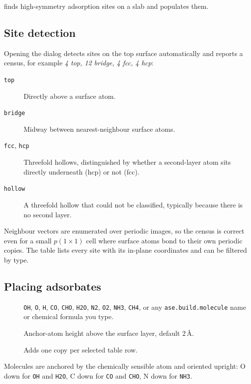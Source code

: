 \menusep{} finds high-symmetry
adsorption sites on a slab and populates them.

\subsection{Site detection}

Opening the dialog detects sites on the top surface automatically and
reports a census, for example \emph{4 top, 12 bridge, 4 fcc, 4 hcp}:

\begin{description}
  \item[\texttt{top}] Directly above a surface atom.
  \item[\texttt{bridge}] Midway between nearest-neighbour surface atoms.
  \item[\texttt{fcc}, \texttt{hcp}] Threefold hollows, distinguished by
    whether a second-layer atom sits directly underneath (hcp) or not
    (fcc).
  \item[\texttt{hollow}] A threefold hollow that could not be classified,
    typically because there is no second layer.
\end{description}

Neighbour vectors are enumerated over periodic images, so the census is
correct even for a small $p(1\times1)$ cell where surface atoms bond to
their own periodic copies. The table lists every site with its in-plane
coordinates and can be filtered by type.

\subsection{Placing adsorbates}

\begin{description}
  \item[] \texttt{OH}, \texttt{O}, \texttt{H}, \texttt{CO},
    \texttt{CHO}, \texttt{H2O}, \texttt{N2}, \texttt{O2}, \texttt{NH3},
    \texttt{CH4}, or any \texttt{ase.build.molecule} name or chemical
    formula you type.
  \item[] Anchor-atom height above the surface layer, default
    2\,\AA.
  \item[] Adds one copy per selected table row.
\end{description}

Molecules are anchored by the chemically sensible atom and oriented
upright: O down for \texttt{OH} and \texttt{H2O}, C down for \texttt{CO}
and \texttt{CHO}, N down for \texttt{NH3}.

